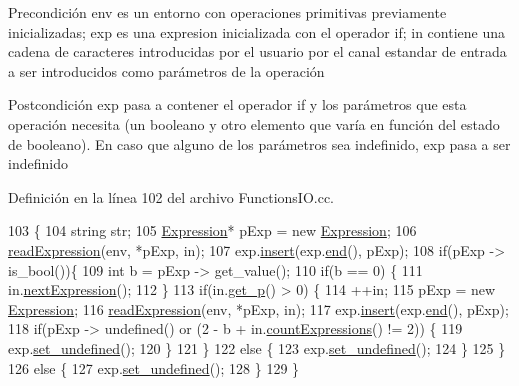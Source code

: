 \begin{DoxyPrecond}{Precondición}
\textquotesingle{}env\textquotesingle{} es un entorno con operaciones primitivas previamente inicializadas; \textquotesingle{}exp\textquotesingle{} es una expresion inicializada con el operador \textquotesingle{}if\textquotesingle{}; \textquotesingle{}in\textquotesingle{} contiene una cadena de caracteres introducidas por el usuario por el canal estandar de entrada a ser introducidos como parámetros de la operación 
\end{DoxyPrecond}
\begin{DoxyPostcond}{Postcondición}
\textquotesingle{}exp\textquotesingle{} pasa a contener el operador \textquotesingle{}if\textquotesingle{} y los parámetros que esta operación necesita (un booleano y otro elemento que varía en función del estado de booleano). En caso que alguno de los parámetros sea indefinido, \textquotesingle{}exp\textquotesingle{} pasa a ser indefinido 
\end{DoxyPostcond}


Definición en la línea 102 del archivo Functions\+I\+O.\+cc.


\begin{DoxyCode}
103 \{
104   \textcolor{keywordtype}{string} str;
105   \hyperlink{class_expression}{Expression}* pExp = \textcolor{keyword}{new} \hyperlink{class_expression}{Expression};
106   \hyperlink{_functions_i_o_8cc_a0c2a0ba0f4fe2dfe26ec14053ce4d408}{readExpression}(env, *pExp, in);
107   exp.\hyperlink{class_expression_a2f087974bb5cee7d0ea06838f5d68ba8}{insert}(exp.\hyperlink{class_expression_af5229aaf6bbb7200db55f220f315192e}{end}(), pExp);
108   \textcolor{keywordflow}{if}(pExp -> is\_bool())\{
109     \textcolor{keywordtype}{int} b = pExp -> get\_value();
110     \textcolor{keywordflow}{if}(b == 0) \{
111       in.\hyperlink{class_input_a1c8a389a2bccdcc8c6206c2fbdd6a9f8}{nextExpression}();
112     \}
113     \textcolor{keywordflow}{if}(in.\hyperlink{class_input_a61a5b6e5b3e5d7b3022cf93ee5320a1e}{get\_p}() > 0) \{
114       ++in;
115       pExp = \textcolor{keyword}{new} \hyperlink{class_expression}{Expression};
116       \hyperlink{_functions_i_o_8cc_a0c2a0ba0f4fe2dfe26ec14053ce4d408}{readExpression}(env, *pExp, in);
117       exp.\hyperlink{class_expression_a2f087974bb5cee7d0ea06838f5d68ba8}{insert}(exp.\hyperlink{class_expression_af5229aaf6bbb7200db55f220f315192e}{end}(), pExp);
118       \textcolor{keywordflow}{if}(pExp -> undefined() or  (2 - b + in.\hyperlink{class_input_ac9f1e2e25646ce602cf9ff83dcc563fe}{countExpressions}() != 2)) \{
119         exp.\hyperlink{class_expression_a1d3ddfe83d20f47930792807e8b22248}{set\_undefined}();
120       \}
121     \}
122     \textcolor{keywordflow}{else} \{
123       exp.\hyperlink{class_expression_a1d3ddfe83d20f47930792807e8b22248}{set\_undefined}();
124     \}
125   \}
126   \textcolor{keywordflow}{else} \{
127     exp.\hyperlink{class_expression_a1d3ddfe83d20f47930792807e8b22248}{set\_undefined}();
128   \}
129 \}
\end{DoxyCode}
